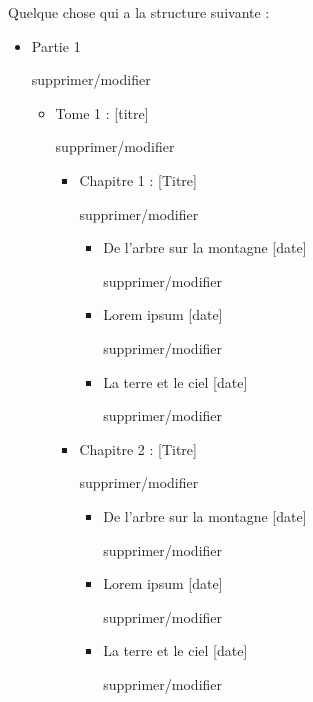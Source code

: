 \documentclass[french]{report}
\theoremstyle{plain}
\begin{document}
				Quelque chose qui a la structure suivante :
				\begin{itemize}
					\item Partie 1 \begin{bfseries} supprimer/modifier \end{bfseries}
					\begin{itemize}
						\item Tome 1 : [titre] \begin{bfseries} supprimer/modifier \end{bfseries}
						\begin{itemize} 
							\item Chapitre 1 : [Titre] \begin{bfseries} supprimer/modifier \end{bfseries}
							\begin{itemize}
								\item De l'arbre sur la montagne [date] \begin{bfseries} supprimer/modifier \end{bfseries}
								\item Lorem ipsum [date] \begin{bfseries} supprimer/modifier \end{bfseries}
								\item La terre et le ciel [date] \begin{bfseries} supprimer/modifier \end{bfseries}
							\end{itemize}
							\item Chapitre 2 : [Titre] \begin{bfseries} supprimer/modifier \end{bfseries}
							\begin{itemize}
								\item De l'arbre sur la montagne [date] \begin{bfseries} supprimer/modifier \end{bfseries}
								\item Lorem ipsum [date] \begin{bfseries} supprimer/modifier \end{bfseries}
								\item La terre et le ciel [date] \begin{bfseries} supprimer/modifier \end{bfseries}
							\end{itemize}
						\end{itemize}

\end{itemize}
\end{itemize}
\end{document}
